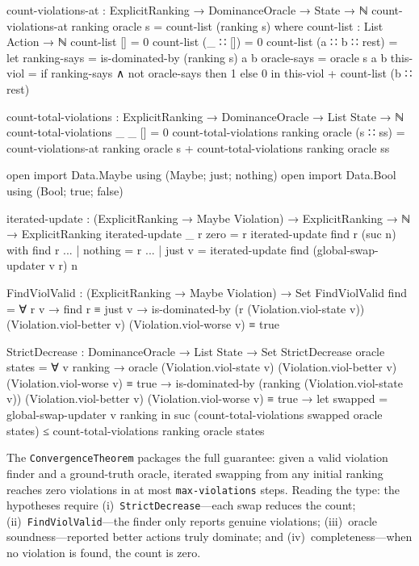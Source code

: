\documentclass[9pt,a4paper]{article}
\theoremstyle{plain}
\theoremstyle{definition}
\theoremstyle{remark}
\begin{document}
\begin{code}[hide]
  count-violations-at : ExplicitRanking → DominanceOracle → State → ℕ
  count-violations-at ranking oracle s = count-list (ranking s)
    where
      count-list : List Action → ℕ
      count-list [] = 0
      count-list (_ ∷ []) = 0
      count-list (a ∷ b ∷ rest) = 
        let ranking-says = is-dominated-by (ranking s) a b
            oracle-says  = oracle s a b
            this-viol    = if ranking-says ∧ not oracle-says then 1 else 0
        in this-viol + count-list (b ∷ rest)

  count-total-violations : ExplicitRanking → DominanceOracle → List State → ℕ
  count-total-violations _ _ [] = 0
  count-total-violations ranking oracle (s ∷ ss) = 
    count-violations-at ranking oracle s + count-total-violations ranking oracle ss

  open import Data.Maybe using (Maybe; just; nothing)
  open import Data.Bool using (Bool; true; false)

  iterated-update : (ExplicitRanking → Maybe Violation) → 
                    ExplicitRanking → ℕ → ExplicitRanking
  iterated-update _ r zero = r
  iterated-update find r (suc n) with find r
  ... | nothing = r
  ... | just v  = iterated-update find (global-swap-updater v r) n

  FindViolValid : (ExplicitRanking → Maybe Violation) → Set
  FindViolValid find = ∀ r v → find r ≡ just v → 
    is-dominated-by (r (Violation.viol-state v)) 
      (Violation.viol-better v) (Violation.viol-worse v) ≡ true

  StrictDecrease : DominanceOracle → List State → Set
  StrictDecrease oracle states = ∀ v ranking →
    oracle (Violation.viol-state v) (Violation.viol-better v) 
           (Violation.viol-worse v) ≡ true →
    is-dominated-by (ranking (Violation.viol-state v)) 
      (Violation.viol-better v) (Violation.viol-worse v) ≡ true →
    let swapped = global-swap-updater v ranking
    in suc (count-total-violations swapped oracle states) ≤ 
       count-total-violations ranking oracle states
\end{code}

\noindent The \texttt{ConvergenceTheorem} packages the full guarantee: given a valid violation finder and a ground-truth oracle, iterated swapping from any initial ranking reaches zero violations in at most \texttt{max-violations} steps.  Reading the type: the hypotheses require (i)~\texttt{StrictDecrease}---each swap reduces the count; (ii)~\texttt{FindViolValid}---the finder only reports genuine violations; (iii)~oracle soundness---reported better actions truly dominate; and (iv)~completeness---when no violation is found, the count is zero.
\end{document}
